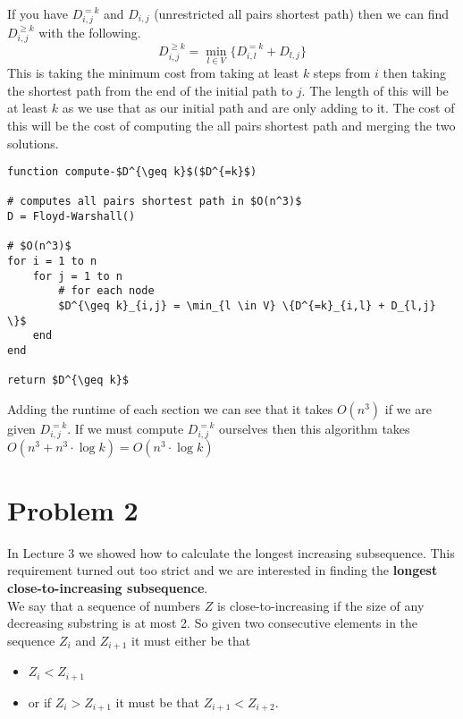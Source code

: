 \documentclass{article}
\begin{document}
\begin{enumerate}[a)]
If you have $D^{=k}_{i,j}$ and $D_{i,j}$ (unrestricted all pairs shortest path) then we can find $D^{\geq k}_{i,j}$ with the following.
$$D^{\geq k}_{i,j} = \min_{l \in V} \{D^{=k}_{i,l} + D_{l,j} \}$$
This is taking the minimum cost from taking at least $k$ steps from $i$ then taking the shortest path from the end of the initial path to $j$.
The length of this will be at least $k$ as we use that as our initial path and are only adding to it.
The cost of this will be the cost of computing the all pairs shortest path and merging the two solutions.
\begin{lstlisting}
function compute-$D^{\geq k}$($D^{=k}$)

# computes all pairs shortest path in $O(n^3)$
D = Floyd-Warshall()

# $O(n^3)$
for i = 1 to n
    for j = 1 to n
        # for each node
        $D^{\geq k}_{i,j} = \min_{l \in V} \{D^{=k}_{i,l} + D_{l,j} \}$
    end
end

return $D^{\geq k}$
\end{lstlisting}

Adding the runtime of each section we can see that it takes $O(n^3)$ if we are given $D^{=k}_{i,j}$.
If we must compute $D^{=k}_{i,j}$ ourselves then this algorithm takes $O(n^3 + n^3 \cdot \log k) = O(n^3 \cdot \log k)$



\end{enumerate}

\newpage
\section*{Problem 2}
In Lecture 3 we showed how to calculate the longest increasing subsequence. This requirement turned out too strict and we are interested in finding the \textbf{longest close-to-increasing subsequence}.\\
\indent We say that a sequence of numbers $Z$ is close-to-increasing if the size of any decreasing substring is at most 2.
So given two consecutive elements in the sequence $Z_i$ and $Z_{i+1}$ it must either be that
\begin{itemize}
\item $Z_i < Z_{i+1}$

\item or if $Z_i > Z_{i+1}$ it must be that $Z_{i+1} < Z_{i+2}$.
\end{itemize}
\end{document}
